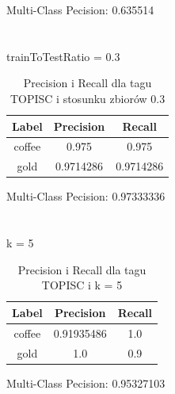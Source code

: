 \documentclass{classrep}
\begin{document}
Multi-Class Pecision: 0.635514\\
\\
\\
trainToTestRatio = 0.3
\begin{table}[H]
\begin{tabular}{|c|c|c|}
\hline
Label  & Precision & Recall    \\ \hline
coffee & 0.975     & 0.975     \\ \hline
gold   & 0.9714286 & 0.9714286 \\ \hline
\end{tabular}
\caption{Precision i Recall dla tagu TOPISC i stosunku zbiorów 0.3}
\end{table}
Multi-Class Pecision: 0.97333336\\
\\
\\
k = 5
\begin{table}[H]
\begin{tabular}{|c|c|c|}
\hline
Label  & Precision  & Recall \\ \hline
coffee & 0.91935486 & 1.0    \\ \hline
gold   & 1.0        & 0.9    \\ \hline
\end{tabular}
\caption{Precision i Recall dla tagu TOPISC i k = 5}
\end{table}
Multi-Class Pecision: 0.95327103
\end{document}
